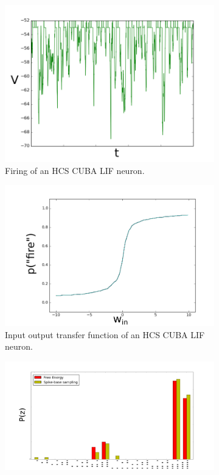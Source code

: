 \begin{figure}
	\centering
	\begin{subfigure}[t]{.5\textwidth}
  		\centering
  		\includegraphics[width=.8\linewidth]{imgs/cuba_lif_act.png}
  		\caption{Firing of an HCS CUBA LIF neuron.}
  		\label{fig:sub1}
	\end{subfigure}%
	\begin{subfigure}[t]{.5\textwidth}
  		\centering
  		\includegraphics[width=.8\linewidth]{imgs/cuba_lif_sigmoid.png}
  		\caption{Input output transfer function of an HCS CUBA LIF neuron.}
  		\label{fig:sub2}
	\end{subfigure}
	\begin{subfigure}[t]{.5\textwidth}
  		\centering
  		\includegraphics[width=.8\linewidth]{imgs/cuba_lif_bm.png}

\end{subfigure}
\end{figure}
